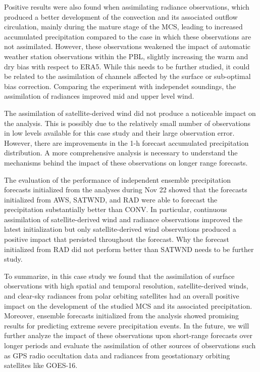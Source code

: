 \documentclass[final,5p,times,twocolumn,authoryear]{elsarticle} %
\begin{document}
Positive results were also found when assimilating radiance observations, which produced a better development of the convection and its associated outflow circulation, mainly during the mature stage of the MCS, leading to increased accumulated precipitation compared to the case in which these observations are not assimilated. However, these observations weakened the impact of automatic weather station observations within the PBL, slightly increasing the warm and dry bias with respect to ERA5. While this needs to be further studied, it could be related to the assimilation of channels affected by the surface or sub-optimal bias correction. Comparing the experiment with independet soundings, the assimilation of radiances improved mid and upper level wind.

The assimilation of satellite-derived wind did not produce a noticeable impact on the analysis. This is possibly due to the relatively small number of observations in low levels available for this case study and their large observation error. However, there are improvements in the 1-h forecast accumulated precipitation distribution. A more comprehensive analysis is necessary to understand the mechanisms behind the impact of these observations on longer range forecasts.

The evaluation of the performance of independent ensemble precipitation forecasts initialized from the analyses during Nov 22 showed that the forecasts initialized from AWS, SATWND, and RAD were able to forecast the precipitation substantially better than CONV. In particular, continuous assimilation of satellite-derived wind and radiance observations improved the latest initialization but only satellite-derived wind observations produced a positive impact that persisted throughout the forecast. Why the forecast initialized from RAD did not perform better than SATWND needs to be further study.

To summarize, in this case study we found that the assimilation of surface observations with high spatial and temporal resolution, satellite-derived winds, and clear-sky radiances from polar orbiting satellites had an overall positive impact on the development of the studied MCS and its associated precipitation. Moreover, ensemble forecasts initialized from the analysis showed promising results for predicting extreme severe precipitation events. In the future, we will further analyze the impact of these observations upon short-range forecasts over longer periods and evaluate the assimilation of other sources of observations such as GPS radio occultation data and radiances from geostationary orbiting satellites like GOES-16.
\end{document}
